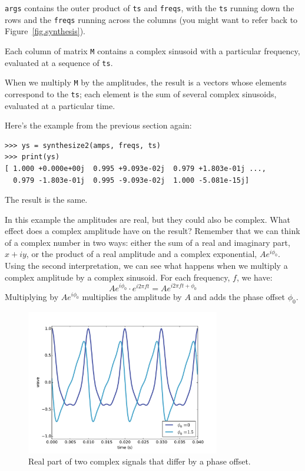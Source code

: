 \documentclass[12pt]{book}
\begin{document}
{\tt args} contains the outer product of {\tt ts} and {\tt freqs},
with the {\tt ts} running down the rows and the {\tt freqs} running
across the columns (you might want to refer back to
Figure~\ref{fig.synthesis}).

Each column of matrix {\tt M} contains a complex sinusoid with
a particular frequency, evaluated at a sequence of {\tt ts}.

When we multiply {\tt M} by the amplitudes, the result is a
vectors whose
elements correspond to the {\tt ts}; each element is the sum of
several complex sinusoids, evaluated at a particular time.

Here's the example from the previous section again:

\begin{verbatim}
>>> ys = synthesize2(amps, freqs, ts)
>>> print(ys)
[ 1.000 +0.000e+00j  0.995 +9.093e-02j  0.979 +1.803e-01j ...,
  0.979 -1.803e-01j  0.995 -9.093e-02j  1.000 -5.081e-15j]
\end{verbatim}

The result is the same.

In this example the amplitudes are real, but they could also be
complex.  What effect does a complex amplitude have on the result?
Remember that we can think of a complex number in two ways: either the
sum of a real and imaginary part, $x + i y$, or the product of a real
amplitude and a complex exponential, $A e^{i \phi_0}$.  Using the
second interpretation, we can see what happens when we multiply
a complex amplitude by a complex sinusoid.  For each frequency, $f$,
we have:
%
\[ A e^{i \phi_0} \cdot e^{i 2 \pi f t} = A e^{i 2 \pi f t + \phi_0} \]
%
Multiplying by $A e^{i \phi_0}$ multiplies the amplitude by $A$
and adds the phase offset $\phi_0$.

\begin{figure}
\centerline{\includegraphics[height=2.5in]{figs/dft2.pdf}}
\caption{Real part of two complex signals that differ by a phase
offset.}
\label{fig.dft2}
\end{figure}
\end{document}
